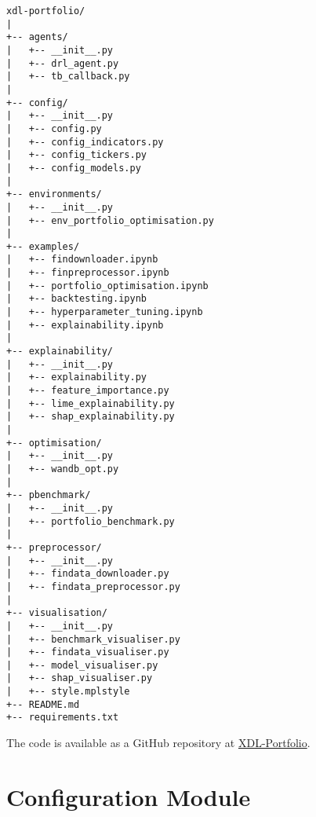 \begin{verbatim}
xdl-portfolio/
|
+-- agents/
|   +-- __init__.py
|   +-- drl_agent.py
|   +-- tb_callback.py
|
+-- config/
|   +-- __init__.py
|   +-- config.py
|   +-- config_indicators.py
|   +-- config_tickers.py
|   +-- config_models.py
|
+-- environments/
|   +-- __init__.py
|   +-- env_portfolio_optimisation.py
|
+-- examples/
|   +-- findownloader.ipynb
|   +-- finpreprocessor.ipynb
|   +-- portfolio_optimisation.ipynb
|   +-- backtesting.ipynb
|   +-- hyperparameter_tuning.ipynb
|   +-- explainability.ipynb
|
+-- explainability/
|   +-- __init__.py
|   +-- explainability.py
|   +-- feature_importance.py
|   +-- lime_explainability.py
|   +-- shap_explainability.py
|
+-- optimisation/
|   +-- __init__.py
|   +-- wandb_opt.py
|
+-- pbenchmark/
|   +-- __init__.py
|   +-- portfolio_benchmark.py
|
+-- preprocessor/
|   +-- __init__.py
|   +-- findata_downloader.py
|   +-- findata_preprocessor.py
|
+-- visualisation/
|   +-- __init__.py
|   +-- benchmark_visualiser.py
|   +-- findata_visualiser.py
|   +-- model_visualiser.py
|   +-- shap_visualiser.py
|   +-- style.mplstyle
+-- README.md
+-- requirements.txt
\end{verbatim}

The code is available as a GitHub repository at \href{https://github.com/ingridpi/xdl-portfolio.git}{XDL-Portfolio}.

\section{Configuration Module}

\inputminted[fontsize=\footnotesize,linenos,breaklines=true,breakanywhere=true,frame=lines,baselinestretch=1]{python}{../config/config.py}

\inputminted[fontsize=\footnotesize,linenos,breaklines=true,breakanywhere=true,frame=lines,baselinestretch=1]{python}{../config/config_tickers.py}

\inputminted[fontsize=\footnotesize,linenos,breaklines=true,breakanywhere=true,frame=lines,baselinestretch=1]{python}{../config/config_indicators.py}

\inputminted[fontsize=\footnotesize,linenos,breaklines=true,breakanywhere=true,frame=lines,baselinestretch=1]{python}{../config/config_models.py}

